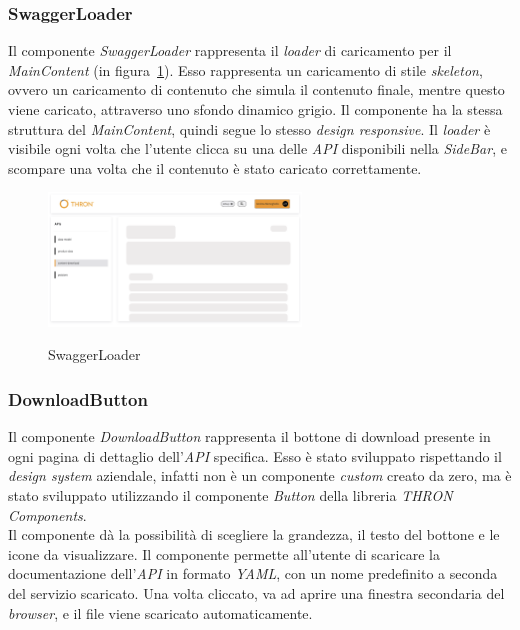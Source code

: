 \subsubsection{SwaggerLoader}\label{subsubsec:swagger-loader}
Il componente \textit{SwaggerLoader} rappresenta il \textit{loader} di caricamento per il \textit{MainContent} (in figura~\ref{fig:swagger-loader}). 
Esso rappresenta un caricamento di stile \textit{skeleton}, ovvero un caricamento di contenuto che simula il contenuto finale, mentre questo viene caricato, attraverso uno sfondo dinamico grigio.
Il componente ha la stessa struttura del \textit{MainContent}, quindi segue lo stesso \textit{design responsive}.
Il \textit{loader} è visibile ogni volta che l'utente clicca su una delle \textit{API} disponibili nella \textit{SideBar}, e scompare una volta che il contenuto è stato caricato correttamente.

\begin{figure}[ht]
  \centering
  \includegraphics[width=0.6\textwidth, alt={Skeleton loader di caricamento per contenuto principale}]{images/frontend/SwaggerLoader.jpg}
  \caption{SwaggerLoader}\label{fig:swagger-loader}
\end{figure}

\subsubsection{DownloadButton}\label{subsubsec:download-button}
Il componente \textit{DownloadButton} rappresenta il bottone di download presente in ogni pagina di dettaglio dell'\textit{API} specifica. Esso è stato sviluppato rispettando il \textit{design system}
aziendale, infatti non è un componente \textit{custom} creato da zero, ma è stato sviluppato utilizzando il componente \textit{Button} della libreria \textit{THRON Components}.\\
Il componente dà la possibilità di scegliere la grandezza, il testo del bottone e le icone da visualizzare.
Il componente permette all'utente di scaricare la documentazione dell'\textit{API} in formato \textit{YAML}, con un nome predefinito a seconda 
del servizio scaricato. Una volta cliccato, va ad aprire una finestra secondaria del \textit{browser}, e il file viene scaricato automaticamente.\\

